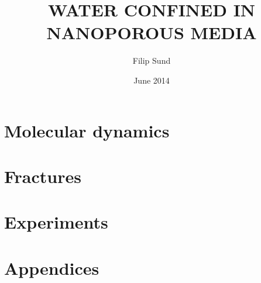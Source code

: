 \documentclass[twoside,english,a4paper,12pt]{uiofysmaster}
\author{Filip Sund}
\title{\uppercase{Water confined in nanoporous media}}
\date{June 2014}
\begin{document}

\cleardoublepage





\tableofcontents

\listoffigures
\listoftables
\listoflistings



\part{Molecular dynamics}
    
%     
    
    
    
    
    

\part{Fractures}
    
    
    
    
    

\part{Experiments}
    
    
    
    

%     

\part{Appendices}
\begin{appendix}
    
    
    
    
\end{appendix}

\printbibliography

\listoftodos
\end{document}
